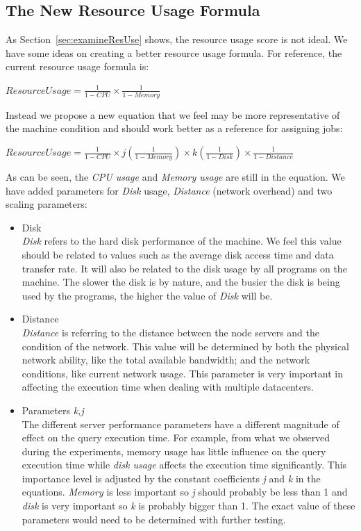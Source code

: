 \subsection{The New Resource Usage Formula}
\label{sec:usageFormula}
As Section~\ref{sec:examineResUse} shows, the resource usage score is not ideal. We have some ideas on creating a better resource usage formula. For reference, the current resource usage formula is:

\begin{center}
$ResourceUsage = \frac{1}{1-CPU} \times \frac{1}{1-Memory}$
\end{center}

Instead we propose a new equation that we feel may be more representative of the machine condition and should work better as a reference for assigning jobs:

\begin{center}
$ResourceUsage = \frac{1}{1-CPU} \times j\left ( \frac{1}{1-Memory} \right ) \times k\left ( \frac{1}{1-Disk} \right ) \times \frac{1}{1-Distance}$
\end{center}

As can be seen, the \textit{CPU usage} and \textit{Memory usage} are still in the equation. We have added parameters for \textit{Disk} usage, \textit{Distance} (network overhead) and two scaling parameters:

\begin{itemize}
\item{Disk} \\
\textit{Disk} refers to the hard disk performance of the machine. We feel this value should be related to values such as the average disk access time and data transfer rate. It will also be related to the disk usage by all programs on the machine. The slower the disk is by nature, and the busier the disk is being used by the programs, the higher the value of \textit{Disk} will be. 
\item{Distance} \\
\textit{Distance} is referring to the distance between the node servers and the condition of the network. This value will be determined by both the physical network ability, like the total available bandwidth; and the network conditions, like current network usage. This parameter is very important in affecting the execution time when dealing with multiple datacenters.
\item{Parameters \textit{k,j}} \\
The different server performance parameters have a different magnitude of effect on the query execution time. For example, from what we observed during the experiments, memory usage has little influence on the query execution time while \textit{disk usage} affects the execution time significantly. This importance level is adjusted by the constant coefficients \textit{j} and \textit{k} in the equations. \textit{Memory} is less important so \textit{j} should probably be less than 1 and \textit{disk} is very important so \textit{k} is probably bigger than 1. The exact value of these parameters would need to be determined with further testing.
\end{itemize}

